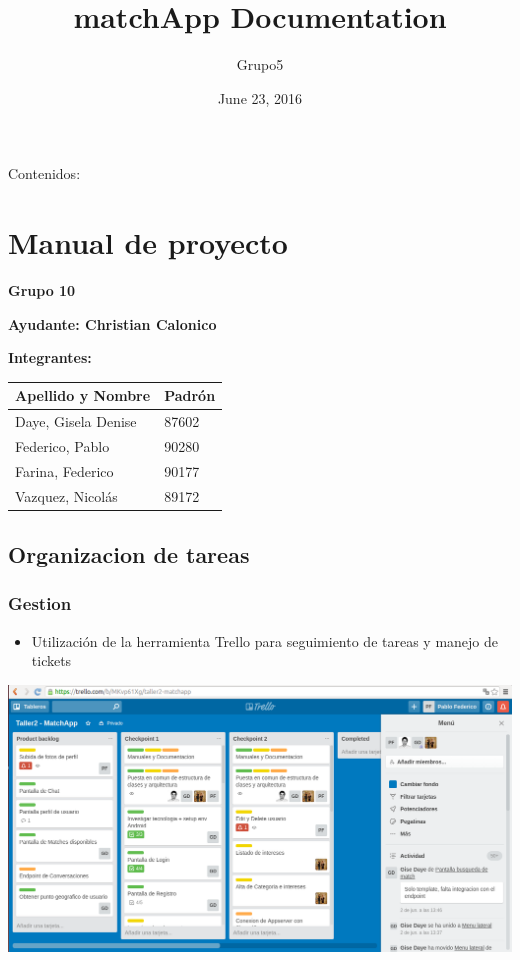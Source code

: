\documentclass[letterpaper,10pt,english]{sphinxmanual}
\title{matchApp Documentation}
\date{June 23, 2016}
\author{Grupo5}
\begin{document}
\maketitle
\tableofcontents
{}\label{index::doc}


Contenidos:


\chapter{Manual de proyecto}
\label{manuals:manual-de-proyecto}\label{manuals::doc}\label{manuals:documentacion-de-matchapp}
\textbf{Grupo 10}

\textbf{Ayudante: Christian Calonico}

\textbf{Integrantes:}

\begin{tabulary}{\linewidth}{|L|L|}
\hline
\textsf{\relax 
Apellido y Nombre
} & \textsf{\relax 
Padrón
}\\
\hline
Daye, Gisela Denise
 & 
87602
\\
\hline
Federico, Pablo
 & 
90280
\\
\hline
Farina, Federico
 & 
90177
\\
\hline
Vazquez, Nicolás
 & 
89172
\\
\hline\end{tabulary}



\section{Organizacion de tareas}
\label{manuals:organizacion-de-tareas}

\subsection{Gestion}
\label{manuals:gestion}\begin{itemize}
\item {} 
Utilización de la herramienta Trello para seguimiento de tareas y manejo de tickets

\end{itemize}

\includegraphics{trello.png}
\end{document}
